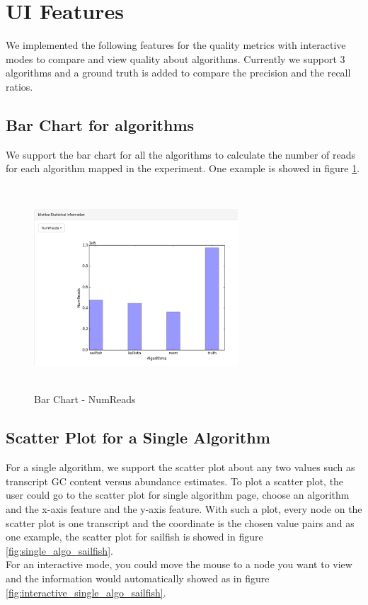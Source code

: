 \documentclass[11pt,letter]{article}
\begin{document}
\section {UI Features}
We implemented the following features for the quality metrics with interactive modes to compare and view quality about algorithms. Currently we support 3 algorithms and a ground truth is added to compare the precision and the recall ratios.
\subsection {Bar Chart for algorithms}
We support the bar chart for all the algorithms to calculate the number of reads for each algorithm mapped in the experiment. One example is showed in figure \ref{fig:barchart_numreads}.

\begin{figure}[h!]
\centering
\includegraphics[height=3in, width=3in]{./fig/barchar_numreads.jpg}
\caption{Bar Chart - NumReads}
\label{fig:barchart_numreads}
\end{figure}

\subsection {Scatter Plot for a Single Algorithm}
For a single algorithm, we support the scatter plot about any two values such as transcript GC content versus abundance estimates. To plot a scatter plot, the user could go to the scatter plot for single algorithm page, choose an algorithm and the x-axis feature and the y-axis feature. With such a plot, every node on the scatter plot is one transcript and the coordinate is the chosen value pairs and as one example, the scatter plot for sailfish is showed in figure \ref{fig:single_algo_sailfish}. \\
For an interactive mode, you could move the mouse to a node you want to view and the information would automatically showed as in figure \ref{fig:interactive_single_algo_sailfish}.
\end{document}
